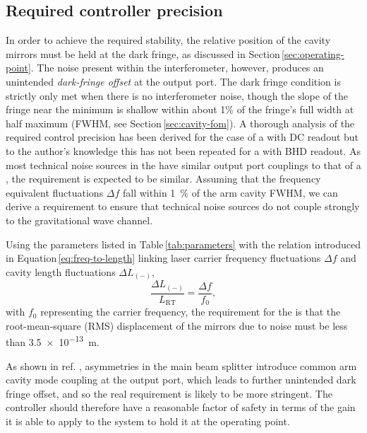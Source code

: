 
\subsection{\label{sec:ssm-required-control}Required controller precision}

In order to achieve the required stability, the relative position of the cavity mirrors must be held at the dark fringe, as discussed in Section\,\ref{sec:operating-point}. The noise present within the interferometer, however, produces an unintended \emph{dark-fringe offset} at the output port. The dark fringe condition is strictly only met when there is no interferometer noise, though the slope of the fringe near the minimum is shallow within about 1\% of the fringe's full width at half maximum (\gls{FWHM}, see Section\,\ref{sec:cavity-fom}). A thorough analysis of the required control precision has been derived for the case of a \DRFPMI{} with \gls{DC} readout \cite{Vajente2011} but to the author's knowledge this has not been repeated for a \SSM{} with \gls{BHD} readout. As most technical noise sources in the \SSM{} have similar output port couplings to that of a \MI{}, the requirement is expected to be similar. Assuming that the frequency equivalent fluctuations $\Delta f$ fall within \SI{1}{\percent} of the arm cavity \gls{FWHM}, we can derive a requirement to ensure that technical noise sources do not couple strongly to the gravitational wave channel.

Using the parameters listed in Table\,\ref{tab:parameters} with the relation introduced in Equation\,\ref{eq:freq-to-length} linking laser carrier frequency fluctuations $\Delta f$ and cavity length fluctuations $\Delta L_{\left(-\right)}$,
\begin{equation}
  \frac{\Delta L_{\left(-\right)}}{L_{\textrm{RT}}} = \frac{\Delta f}{f_{0}},
\end{equation}
with $f_{0}$ representing the carrier frequency, the requirement for the \SSMEXPT{} is that the root-mean-square (\gls{RMS}) displacement of the mirrors due to noise must be less than \SI{3.5e-13}{\meter}.

As shown in ref. \cite{Danilishin2015}, asymmetries in the main beam splitter introduce common arm cavity mode coupling at the output port, which leads to further unintended dark fringe offset, and so the real requirement is likely to be more stringent. The controller should therefore have a reasonable factor of safety in terms of the gain it is able to apply to the system to hold it at the operating point.

